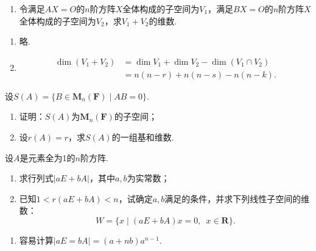 \begin{exercise}
\begin{exgroup}
\begin{enumerate}
            \item 令满足$AX=O$的$n$阶方阵$X$全体构成的子空间为$V_1$，满足$BX=O$的$n$阶方阵$X$全体构成的子空间为$V_2$，求$V_1+V_2$的维数.
        \end{enumerate}
        \begin{answer}
            \begin{enumerate}
                \item 略.

                \item \begin{align*}
                          \dim(V_1+V_2) & =\dim V_1+\dim V_2-\dim(V_1\cap V_2) \\
                                        & =n(n-r)+n(n-s)-n(n-k).
                      \end{align*}
            \end{enumerate}
        \end{answer}

        \item 设$S(A)=\{B \in \mathbf{M}_n(\mathbf{F}) \mid AB=0\}$.
        \begin{enumerate}
            \item 证明：$S(A)$为$\mathbf{M}_n(\mathbf{F})$的子空间；

            \item 设$r(A)=r$，求$S(A)$的一组基和维数.
        \end{enumerate}

        \item 设$A$是元素全为1的$n$阶方阵.
        \begin{enumerate}
            \item 求行列式$|aE+bA|$，其中$a,b$为实常数；

            \item 已知$1<r(aE+bA)<n$，试确定$a,b$满足的条件，并求下列线性子空间的维数：
                  \[W=\{x \mid (aE+bA)x=0,\enspace x\in\mathbf{R}\}.\]
        \end{enumerate}
        \begin{answer}
            \begin{enumerate}
                \item 容易计算$|aE=bA|=(a+nb)a^{n-1}$.


\end{enumerate}
\end{answer}
\end{exgroup}
\end{exercise}
